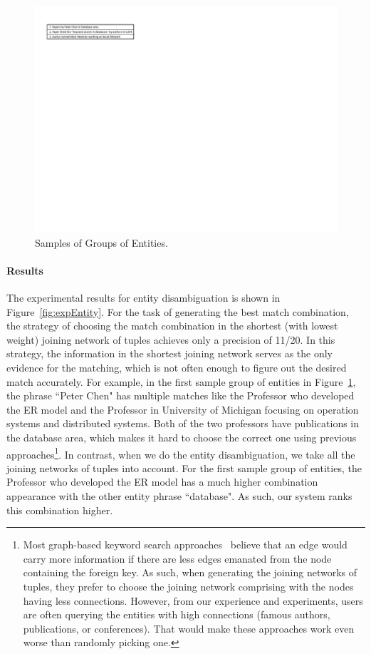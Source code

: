\documentclass{vldb}
\begin{document}
\begin{figure}
  \center
  \includegraphics[width=1\linewidth]{pic/sampleEntities.pdf}
  \caption{Samples of Groups of Entities.}
  \label{fig:sampleEntities}
\end{figure}

\paragraph*{Results}
The experimental results for entity disambiguation is shown in Figure~\ref{fig:expEntity}.  For the task of generating the best match combination, the strategy of choosing the match combination in the shortest (with lowest weight) joining network of tuples achieves only a precision of 11/20.  In this strategy, the information in the shortest joining network serves as the only evidence for the matching, which is not often enough to figure out the desired match accurately.  For example, in the first sample group of entities in Figure~\ref{fig:sampleEntities}, the phrase ``Peter Chen" has multiple matches like the Professor who developed the ER model and the Professor in University of Michigan focusing on operation systems and distributed systems.  Both of the two professors have  publications in the database area, which makes it hard to choose the correct one using previous approaches\footnote{Most graph-based keyword search approaches~\cite{DBLP:conf/icde/BhalotiaHNCS02,DBLP:conf/icde/DingYWQZL07,DBLP:conf/sigmod/GolenbergKS08} believe that an edge would carry more information if there are less edges emanated from the node containing the foreign key.  As such, when generating the joining networks of tuples, they prefer to choose the joining network comprising with the nodes having less connections.  However, from our experience and experiments, users are often querying the entities with high connections (famous authors, publications, or conferences).  That would make these approaches work even worse than randomly picking one.  }.  In contrast, when we do the entity disambiguation, we take all the joining networks of tuples into account.  For the first sample group of entities, the Professor who developed the ER model has a much higher combination appearance with the other entity phrase ``database".  As such, our system ranks this combination higher.  
\end{document}
